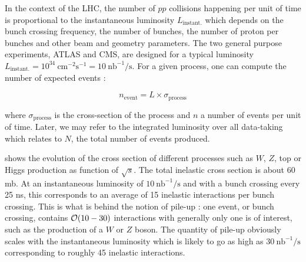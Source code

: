 

    In the context of the LHC, the number of $pp$ collisions happening per unit of time is
    proportional to the instantaneous luminosity $L_\text{instant.}$ which depends on the bunch crossing
    frequency, the number of bunches, the number of proton per bunches and other beam and
    geometry parameters. The two general purpose experiments, ATLAS and CMS, are designed
    for a typical luminosity $L_\text{instant.} = 10^{34}~\text{cm}^{-2}
    \text{s}^{-1} = 10~\text{nb}^{-1} / \text{s}$. For a given process, one can compute
    the number of expected events :

    $$ n_\text{event} = L \times \sigma_\text{process} $$

    where $\sigma_\text{process}$ is the cross-section of the process and $n$ a number
    of events per unit of time. Later, we may refer to the integrated luminosity over all
    data-taking which relates to $N$, the total number of events produced.

     shows the evolution of the cross section of different
    processes such as $W$, $Z$, top or Higgs production as function of $\sqrt{s}$. The
    total inelastic cross section is about 60 mb. At an instantaneous luminosity of
    $10~\text{nb}^{-1} / \text{s}$ and with a bunch crossing every 25 ns, this corresponds
    to an average of 15 inelastic interactions per bunch crossing. This is what is behind
    the notion of pile-up : one event, or bunch crossing, contains $\mathcal{O}(10-30)$ interactions
    with generally only one is of interest, such as the production of a $W$ or $Z$ boson.
    The quantity of pile-up obviously scales with the instantaneous luminosity which
    is likely to go as high as $30~\text{nb}^{-1} / \text{s}$ corresponding to roughly 45
    inelastic interactions.

